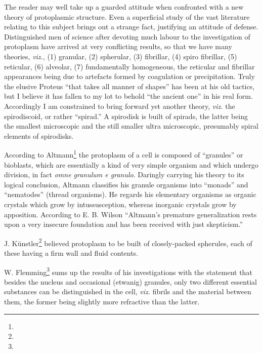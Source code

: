 \documentclass[a4paper, 12pt, oneside]{article}
\begin{document}
The reader may well take up a guarded attitude when confronted with a new theory of protoplasmic structure. Even a superficial study of the vast literature relating to this subject brings out a strange fact, justifying an attitude of defense. Distinguished men of science after devoting much labour to the investigation of protoplasm have arrived at very conflicting results, so that we have many theories, \emph{viz.}, (1) granular, (2) spherular, (3) fibrillar, (4) spiro fibrillar, (5) reticular, (6) alveolar, (7) fundamentally homogeneous, the reticular and fibrillar appearances being due to artefacts formed by coagulation or precipitation. Truly the elusive Proteus ``that takes all manner of shapes'' has been at his old tactics, but I believe it has fallen to my lot to behold ``the ancient one'' in his real form. Accordingly I am constrained to bring forward yet another theory, \emph{viz.} the spirodiscoid, or rather ``spirad.'' A spirodisk is built of spirads, the latter being the smallest microscopic and the still smaller ultra microscopic, presumably spiral elements of spirodisks.

According to Altmann\footnote{} the protoplasm of a cell is composed of ``granules'' or bioblasts, which are essentially a kind of very simple organism and which undergo division, in fact \emph{omne granulum e granulo}. Daringly carrying his theory to its logical conclusion, Altmann classifies his granule organisms into ``monads'' and ``nematodes'' (thread organisms). He regards his elementary organisms as organic crystals which grow by intussusception, whereas inorganic crystals grow by apposition. According to E. B. Wilson ``Altmann's premature generalization rests upon a very insecure foundation and has been received with just skepticism.''

J. Künstler\footnote{} believed protoplasm to be built of closely-packed spherules, each of these having a firm wall and fluid contents.

W. Flemming\footnote{} sums up the results of his investigations with the statement that besides the nucleus and occasional (etwanig) granules, only two different essential substances can be distinguished in the cell, \emph{viz.} fibrils and the material between them, the former being slightly more refractive than the latter.
\end{document}
